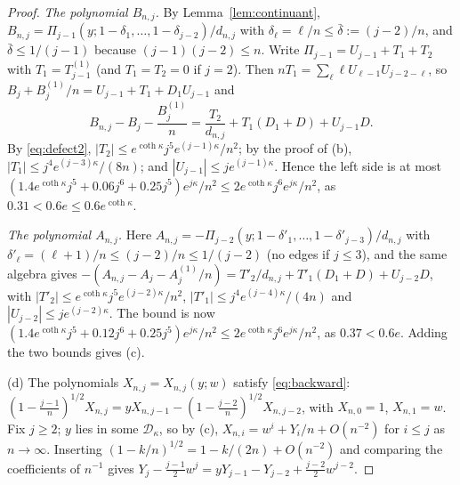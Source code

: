 \documentclass[11pt]{amsart}
\theoremstyle{definition}
\theoremstyle{remark}
\numberwithin{equation}{section}
\begin{document}
\begin{proof}
\emph{The polynomial $B_{n,j}$.} By Lemma~\ref{lem:continuant}, $B_{n,j}=\Pi_{j-1}(y;1-\delta_1,\dots,1-\delta_{j-2})/d_{n,j}$
with $\delta_\ell=\ell/n\le\bar\delta:=(j-2)/n$, and $\bar\delta\le1/(j-1)$ because $(j-1)(j-2)\le n$. Write
$\Pi_{j-1}=U_{j-1}+T_1+T_2$ with $T_1=T^{(1)}_{j-1}$ (and $T_1=T_2=0$ if $j=2$). Then $nT_1=\sum_\ell\ell U_{\ell-1}U_{j-2-\ell}$,
so $B_j+B^{(1)}_j/n=U_{j-1}+T_1+D_1U_{j-1}$ and
\[
B_{n,j}-B_j-\frac{B^{(1)}_j}n=\frac{T_2}{d_{n,j}}+T_1(D_1+D)+U_{j-1}D .
\]
By \eqref{eq:defect2}, $|T_2|\le e^{\coth\kappa}j^5e^{(j-1)\kappa}/n^2$; by the proof of (b), $|T_1|\le j^4e^{(j-3)\kappa}/(8n)$;
and $|U_{j-1}|\le je^{(j-1)\kappa}$. Hence the left side is at most
$(1.4e^{\coth\kappa}j^5+0.06j^6+0.25j^5)e^{j\kappa}/n^2\le2e^{\coth\kappa}j^6e^{j\kappa}/n^2$, as $0.31<0.6e\le0.6e^{\coth\kappa}$.

\emph{The polynomial $A_{n,j}$.} Here $A_{n,j}=-\Pi_{j-2}(y;1-\delta'_1,\dots,1-\delta'_{j-3})/d_{n,j}$ with
$\delta'_\ell=(\ell+1)/n\le(j-2)/n\le1/(j-2)$ (no edges if $j\le3$), and the same algebra gives
$-(A_{n,j}-A_j-A^{(1)}_j/n)=T'_2/d_{n,j}+T'_1(D_1+D)+U_{j-2}D$, with $|T'_2|\le e^{\coth\kappa}j^5e^{(j-2)\kappa}/n^2$,
$|T'_1|\le j^4e^{(j-4)\kappa}/(4n)$ and $|U_{j-2}|\le je^{(j-2)\kappa}$. The bound is now
$(1.4e^{\coth\kappa}j^5+0.12j^6+0.25j^5)e^{j\kappa}/n^2\le2e^{\coth\kappa}j^6e^{j\kappa}/n^2$, as $0.37<0.6e$.
Adding the two bounds gives (c).

(d) The polynomials $X_{n,j}=X_{n,j}(y;w)$ satisfy \eqref{eq:backward}:
$(1-\frac{j-1}n)^{1/2}X_{n,j}=yX_{n,j-1}-(1-\frac{j-2}n)^{1/2}X_{n,j-2}$, with $X_{n,0}=1$, $X_{n,1}=w$. Fix $j\ge2$; $y$
lies in some $\mathcal D_\kappa$, so by (c), $X_{n,i}=w^i+Y_i/n+O(n^{-2})$ for $i\le j$ as $n\to\infty$. Inserting
$(1-k/n)^{1/2}=1-k/(2n)+O(n^{-2})$ and comparing the coefficients of $n^{-1}$ gives
$Y_j-\frac{j-1}2w^j=yY_{j-1}-Y_{j-2}+\frac{j-2}2w^{j-2}$.
\end{proof}
\end{document}
